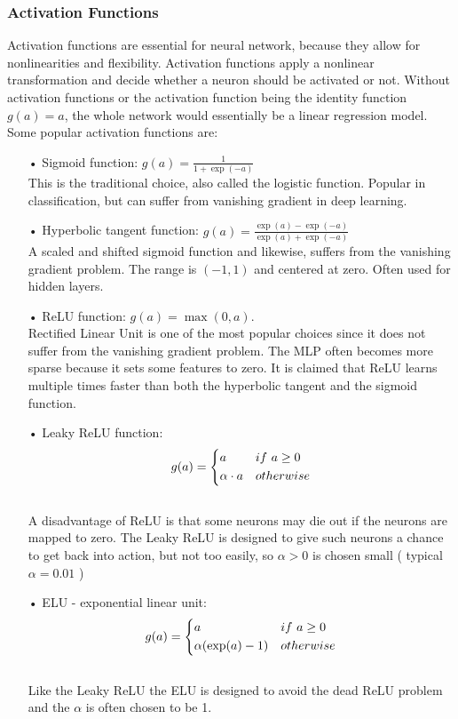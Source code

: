 \subsubsection{Activation Functions}
Activation functions are essential for neural network, because they allow for nonlinearities and flexibility. Activation functions apply a nonlinear transformation and decide whether a neuron should be activated or not. Without activation functions or the activation function being the identity function $g(a)=a$, the whole network would essentially be a linear regression model. Some popular activation functions are:
\begin{enumerate}
\item[•] Sigmoid function: $g(a)=\frac{1}{1+\exp(-a)}$\\

This is the traditional choice, also called the logistic function. Popular in classification, but can suffer from vanishing gradient in deep learning.
\item[•] Hyperbolic tangent function: $g(a)=\frac{\exp(a)-\exp(-a)}{\exp(a)+\exp(-a)}$\\

A scaled and shifted sigmoid function and likewise, suffers from the vanishing gradient problem. The range is $(-1,1)$ and centered at zero. Often used for hidden layers.
\item[•] ReLU function: $g(a)=\max(0,a)$.\\

Rectified Linear Unit is one of the most popular choices since it does not suffer from the vanishing gradient problem. The MLP often becomes more sparse because it sets some features to zero. It is claimed that ReLU learns multiple times faster than both the hyperbolic tangent and the sigmoid function.
\item[•] Leaky ReLU function:  \[ g(a)=
    \begin{dcases}
        a & if \ a \geq 0 \\
        \alpha \cdot a & otherwise \\
    \end{dcases}
\]\\
A disadvantage of ReLU is that some neurons may die out if the neurons are mapped to zero. The Leaky ReLU is designed to give such neurons a chance to get back into action, but not too easily, so $\alpha>0$ is chosen small ( typical $\alpha=0.01$ ) 

\item[•] ELU - exponential linear unit:  \[ g(a)=
    \begin{dcases}
        a & if \ a \geq 0 \\
        \alpha(\exp(a)-1) & otherwise \\
    \end{dcases}
\]\\
Like the Leaky ReLU the ELU is designed to avoid the dead ReLU problem and the $\alpha$ is often chosen to be 1. 
\end{enumerate}

